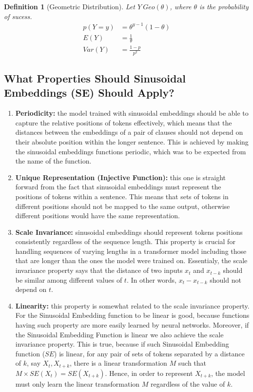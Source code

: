 \documentclass{article}
\newtheorem{definition}{Definition}[section]
\begin{document}
\begin{definition}[Geometric Distribution]
	Let $ Y ~ Geo(\theta)$, where $\theta$ is the probability of sucess.
	\begin{align}
		p(Y = y) & = \theta^{y -1}(1 - \theta) \\
		E(Y) &= \frac{1}{\theta} \\
		Var(Y) &= \frac{1 - p}{p ^2}
	\end{align}
\end{definition}

\subsection{What Properties Should Sinusoidal Embeddings (SE) Should Apply?}

\begin{enumerate}
	\item \textbf{Periodicity:} the model trained with sinusoidal embeddings should be able to capture the relative positions of tokens effectively, which means that the distances between the embeddings of a pair of clauses should not depend on their absolute position within the longer sentence. This is achieved by making the sinusoidal embeddings functions periodic, which was to be expected from the name of the function. 
	\item \textbf{Unique Representation (Injective Function):} this one is straight forward from the fact that  sinusoidal embeddings must represent the positions of tokens within a sentence. This means that sets of tokens in different positions should not be mapped to the same output, otherwise different positions would have the same representation.
	\item \textbf{Scale Invariance:} sinusoidal embeddings should represent tokens positions consistently regardless of the sequence length. This property is crucial for handling sequences of varying lengths in a transformer model including those that are longer than the ones the model were trained on. Essentialy, the scale invariance property says that the distance of two inputs $x_t$ and $x_{t - k}$ should be similar among different values of $t$. In other words, $x_t - x_{t - k}$ should not depend on $t$.
	\item \textbf{Linearity:} this property is somewhat related to the scale invariance property. For the Sinusoidal Embedding function to be linear is good, because functions having such property are more easily learned by neural networks. Moreover, if the Sinusoidal Embedding Function is linear we also achieve the scale invariance property. This is true, because if such Sinusoidal Embedding function ($SE$) is linear, for any pair of sets of tokens separated by a distance of $k$, say $X_t, X_{t+k}$, there is a linear transformation $M$ such that $M \times SE(X_t) = SE(X_{t+k})$. Hence, in order to represent $X_{t+k}$,  the model must only learn the linear transformation $M$ regardless of the value of $k$. 
\end{enumerate}
\end{document}
